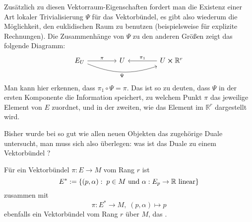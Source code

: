 \documentclass[../H_Analysis_main.tex]{subfiles}
\begin{document}
Zusätzlich zu diesen Vektorraum-Eigenschaften fordert man die Existenz einer Art lokaler Trivialisierung $\Psi$ für das Vektorbündel, es gibt also wiederum die Möglichkeit, den euklidischen Raum zu benutzen (beispielsweise für explizite Rechnungen). Die Zusammenhänge von $\Psi$ zu den anderen Größen zeigt das folgende Diagramm:
$$
\begin{tikzcd}[column sep = 42]
E_U \arrow{r}{\pi} \arrow[swap, bend right = 20]{rr}{\Psi} & U & \arrow[swap]{l}{\pi_1} U \cross \mathbb{R}^r %
\end{tikzcd}
$$
Man kann hier erkennen, dass $\pi_1 \circ \Psi = \pi$. Das ist so zu deuten, dass $\Psi$ in der ersten Komponente die Information speichert, zu welchem Punkt $\pi$ das jeweilige Element von $E$ zuordnet, und in der zweiten, wie das Element im $\mathbb{R}^r$ dargestellt wird.


Bisher wurde bei so gut wie allen neuen Objekten das zugehörige Duale untersucht, man muss sich also überlegen: was ist das Duale zu einem Vektorbündel ?

\begin{satz}
Für ein Vektorbündel $\pi: E \rightarrow M$ vom Rang $r$ ist
\begin{equation}
E^* := \qty{(p, \alpha): \; p \in M \text{ und } \alpha: E_p \rightarrow \mathbb{R} \text{ linear}} %
\end{equation}
zusammen mit
\begin{equation}
\pi: E^* \rightarrow M, \; (p, \alpha) \mapsto p
\end{equation}
ebenfalls ein Vektorbündel vom Rang $r$ über $M$, das .
\end{satz}
\end{document}
